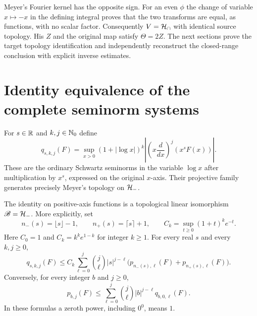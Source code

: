 Meyer's Fourier kernel has the opposite sign. For an even $\phi$ the
change of variable $x\mapsto-x$ in the defining integral proves that
the two transforms are equal, as functions, with no scalar factor.
Consequently $V=\mathcal H_\cap$ with identical source topology. His $Z$ and
the original map satisfy $\Theta=2Z$. The next sections prove the target
topology identification and independently reconstruct the closed-range
conclusion with explicit inverse estimates.

\section{Identity equivalence of the complete seminorm systems}

For $s\in\mathbb R$ and $k,j\in\mathbb N_0$ define
\begin{equation}\label{ltheta:eq:q}
 q_{s,k,j}(F)=\sup_{x>0}(1+|\log x|)^k
 \left|\left(x\frac d{dx}\right)^j(x^sF(x))\right|.
\end{equation}
These are the ordinary Schwartz seminorms in the variable $\log x$
after multiplication by $x^s$, expressed on the original $x$-axis. Their
projective family generates precisely Meyer's topology on $\mathcal H_-$.

\begin{lthetatheorem}\label{ltheta:thm:topology}
The identity on positive-axis functions is a topological linear
isomorphism $\mathscr B=\mathcal H_-$. More explicitly, set
\[
 n_-(s)=\lfloor s\rfloor-1,\qquad n_+(s)=\lceil s\rceil+1,
 \qquad C_k=\sup_{t\geq0}(1+t)^ke^{-t}.
\]
Here $C_0=1$ and $C_k=k^ke^{1-k}$ for integer $k\geq1$.
For every real $s$ and every $k,j\geq0$,
\begin{equation}\label{ltheta:eq:q-from-p}
 q_{s,k,j}(F)\leq C_k\sum_{\ell=0}^j\binom j\ell
 |s|^{j-\ell}\bigl(p_{n_-(s),\ell}(F)+p_{n_+(s),\ell}(F)\bigr).
\end{equation}
Conversely, for every integer $b$ and $j\geq0$,
\begin{equation}\label{ltheta:eq:p-from-q}
 p_{b,j}(F)\leq\sum_{\ell=0}^j\binom j\ell
 |b|^{j-\ell}q_{b,0,\ell}(F).
\end{equation}
In these formulas a zeroth power, including $0^0$, means $1$.
\end{lthetatheorem}

